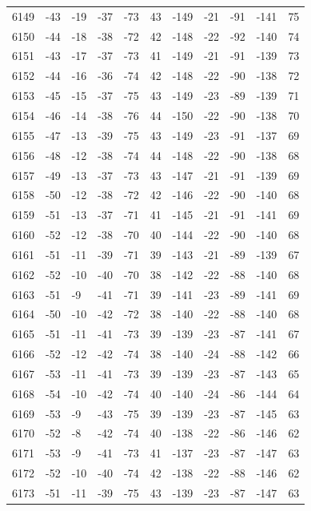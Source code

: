\begin{table}[H]
\begin{tabular}{lllllllllll}
6149 & -43 & -19 & -37 & -73 & 43 & -149 & -21 & -91 & -141 & 75 \\
6150 & -44 & -18 & -38 & -72 & 42 & -148 & -22 & -92 & -140 & 74 \\
6151 & -43 & -17 & -37 & -73 & 41 & -149 & -21 & -91 & -139 & 73 \\
6152 & -44 & -16 & -36 & -74 & 42 & -148 & -22 & -90 & -138 & 72 \\
6153 & -45 & -15 & -37 & -75 & 43 & -149 & -23 & -89 & -139 & 71 \\
6154 & -46 & -14 & -38 & -76 & 44 & -150 & -22 & -90 & -138 & 70 \\
6155 & -47 & -13 & -39 & -75 & 43 & -149 & -23 & -91 & -137 & 69 \\
6156 & -48 & -12 & -38 & -74 & 44 & -148 & -22 & -90 & -138 & 68 \\
6157 & -49 & -13 & -37 & -73 & 43 & -147 & -21 & -91 & -139 & 69 \\
6158 & -50 & -12 & -38 & -72 & 42 & -146 & -22 & -90 & -140 & 68 \\
6159 & -51 & -13 & -37 & -71 & 41 & -145 & -21 & -91 & -141 & 69 \\
6160 & -52 & -12 & -38 & -70 & 40 & -144 & -22 & -90 & -140 & 68 \\
6161 & -51 & -11 & -39 & -71 & 39 & -143 & -21 & -89 & -139 & 67 \\
6162 & -52 & -10 & -40 & -70 & 38 & -142 & -22 & -88 & -140 & 68 \\
6163 & -51 & -9 & -41 & -71 & 39 & -141 & -23 & -89 & -141 & 69 \\
6164 & -50 & -10 & -42 & -72 & 38 & -140 & -22 & -88 & -140 & 68 \\
6165 & -51 & -11 & -41 & -73 & 39 & -139 & -23 & -87 & -141 & 67 \\
6166 & -52 & -12 & -42 & -74 & 38 & -140 & -24 & -88 & -142 & 66 \\
6167 & -53 & -11 & -41 & -73 & 39 & -139 & -23 & -87 & -143 & 65 \\
6168 & -54 & -10 & -42 & -74 & 40 & -140 & -24 & -86 & -144 & 64 \\
6169 & -53 & -9 & -43 & -75 & 39 & -139 & -23 & -87 & -145 & 63 \\
6170 & -52 & -8 & -42 & -74 & 40 & -138 & -22 & -86 & -146 & 62 \\
6171 & -53 & -9 & -41 & -73 & 41 & -137 & -23 & -87 & -147 & 63 \\
6172 & -52 & -10 & -40 & -74 & 42 & -138 & -22 & -88 & -146 & 62 \\
6173 & -51 & -11 & -39 & -75 & 43 & -139 & -23 & -87 & -147 & 63 \\

\end{tabular}
\end{table}
